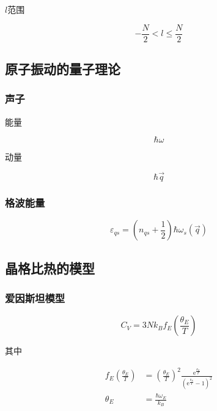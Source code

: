 \documentclass{article}
\newcommand*{\me}{\mathrm{e}}
\begin{document}
\begin{multicols}{2}
$l$范围

\begin{equation*}
  - \frac{N}{2} < l \leq \frac{N}{2}
\end{equation*}

\subsection{原子振动的量子理论}

\subsubsection{声子}

能量

\begin{equation*}
  \hbar \omega
\end{equation*}

动量

\begin{equation*}
  \hbar \vec{q}
\end{equation*}

\subsubsection{格波能量}

\begin{equation*}
  \varepsilon_{qs} = \left( n_{qs} + \frac{1}{2} \right) \hbar \omega_s \left( \vec{q} \right)
\end{equation*}

\subsection{晶格比热的模型}

\subsubsection{爱因斯坦模型}

\begin{equation*}
  C_V = 3Nk_B f_E \left( \frac{\theta_E}{T} \right)
\end{equation*}

其中

\begin{equation*}
  \begin{aligned}
    f_E \left( \frac{\theta_E}{T} \right) &= \left( \frac{\theta_E}{T} \right)^2 \frac{\me^{\frac{\theta_E}{T}}}{\left( \me^{\frac{\theta_E}{T}} -1 \right)^2} \\
    \theta_E &= \frac{\hbar \omega_E}{k_B}
  \end{aligned}
\end{equation*}


\end{multicols}
\end{document}
